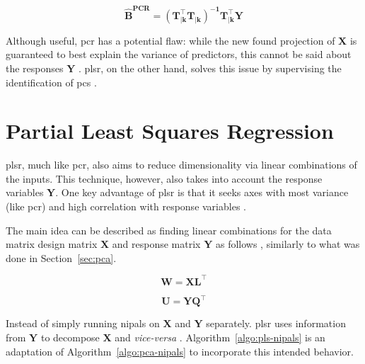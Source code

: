 \begin{equation}
	\label{eqn:beta-pcr}
	\mathbf{\hat{B}^{\text{PCR}} = (T_{|k}^\intercal T_{|k})^{-1}T_{|k}^\intercal Y}
\end{equation}

Although useful, \acrshort{pcr} has a potential flaw: while the new found projection of $\mathbf{X}$ is guaranteed to best explain the variance of predictors, this cannot be said about the responses $\mathbf{Y}$ \parencite{james2013introduction}. \acrshort{plsr}, on the other hand, solves this issue by supervising the identification of \acrshort{pc}s \parencite{james2013introduction}.
	
\section{Partial Least Squares Regression}
\label{sec:plsr}

\acrshort{plsr}, much like \acrshort{pcr}, also aims to reduce dimensionality via linear combinations of the inputs. This technique, however, also takes into account the response variables $\mathbf{Y}$. One key advantage of \acrshort{plsr} is that it seeks axes with most variance (like \acrshort{pcr}) and high correlation with response variables \parencite{friedman2001}.

The main idea can be described as  finding  linear combinations  for the data matrix design matrix $\mathbf{X}$ and response matrix $\mathbf{Y}$ as follows \parencite{ng2013}, similarly to what was done in Section~\ref{sec:pca}.

\begin{equation}
	\label{eqn:x-decomp}
	\mathbf{W=XL^\intercal}
\end{equation}

\begin{equation}
	\label{eqn:y-decomp}
	\mathbf{U = YQ^\intercal}
\end{equation}

Instead of simply running \acrshort{nipals} on $\mathbf{X}$ and $\mathbf{Y}$ separately. \acrshort{plsr} uses information from $\mathbf{Y}$ to decompose $\mathbf{X}$ and \textit{vice-versa} \parencite{ng2013}. Algorithm~\ref{algo:pls-nipals} is an adaptation of Algorithm~\ref{algo:pca-nipals} to incorporate this intended behavior.


